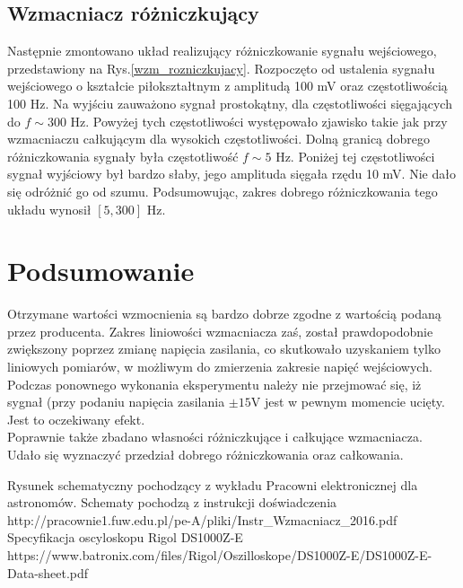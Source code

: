 \documentclass[11pt,a4paper]{article}
\begin{document}
\subsection*{Wzmacniacz różniczkujący}
Następnie zmontowano układ realizujący różniczkowanie sygnału wejściowego, przedstawiony na Rys.\ref{wzm_rozniczkujacy}.  Rozpoczęto od ustalenia sygnału wejściowego o kształcie piłokształtnym z amplitudą 100 mV oraz częstotliwością 100 Hz. Na wyjściu zauważono sygnał prostokątny, dla częstotliwości sięgających do $ f \sim 300$ Hz. Powyżej tych częstotliwości występowało zjawisko takie jak przy wzmacniaczu całkującym dla wysokich częstotliwości. Dolną granicą dobrego różniczkowania sygnały była częstotliwość $f \sim 5$ Hz. Poniżej tej częstotliwości sygnał wyjściowy był bardzo słaby, jego amplituda sięgała rzędu 10 mV. Nie dało się odróżnić go od szumu. Podsumowując, zakres dobrego różniczkowania tego układu wynosił $[5, 300]$ Hz.

\section*{Podsumowanie}
Otrzymane wartości wzmocnienia są bardzo dobrze zgodne z wartością podaną przez producenta. Zakres liniowości wzmacniacza zaś, został prawdopodobnie zwiększony poprzez zmianę napięcia zasilania, co skutkowało uzyskaniem tylko liniowych pomiarów, w możliwym do zmierzenia zakresie napięć wejściowych. Podczas ponownego wykonania eksperymentu należy nie przejmować się, iż sygnał (przy podaniu napięcia zasilania $\pm 15$V jest w pewnym momencie ucięty. Jest to oczekiwany efekt. \\
Poprawnie także zbadano własności różniczkujące i całkujące wzmacniacza. Udało się wyznaczyć przedział dobrego różniczkowania oraz całkowania.


\begin{thebibliography}{}
	 Rysunek schematyczny pochodzący z wykładu Pracowni elektronicznej dla astronomów.
	 Schematy pochodzą z instrukcji doświadczenia http://pracownie1.fuw.edu.pl/pe-A/pliki/Instr\_Wzmacniacz\_2016.pdf
	 Specyfikacja oscyloskopu Rigol DS1000Z-E https://www.batronix.com/files/Rigol/Oszilloskope/DS1000Z-E/DS1000Z-E-Data-sheet.pdf
\end{thebibliography}
\end{document}
